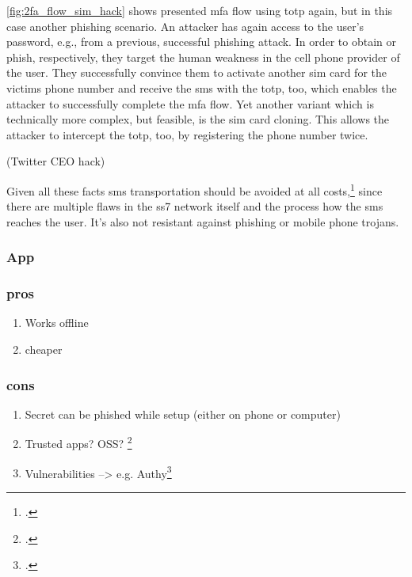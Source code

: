 \autoref{fig:2fa_flow_sim_hack} shows presented \gls{mfa} flow using \gls{totp} again, but in this case another phishing scenario. An attacker has again access to the user's password, e.g., from a previous, successful phishing attack. In order to obtain or phish, respectively, they target the human weakness in the cell phone provider of the user. They successfully convince them to activate another \gls{sim} card for the victims phone number and receive the \gls{sms} with the \gls{totp}, too, which enables the attacker to successfully complete the \gls{mfa} flow. Yet another variant which is technically more complex, but feasible, is the \gls{sim} card cloning. This allows the attacker to intercept the \gls{totp}, too, by registering the phone number twice.

\cite{FIPS198} \cite{SP80063B} (Twitter CEO hack) \cite{twitter-hack}

Given all these facts \gls{sms} transportation should be avoided at all costs,\footcite{JAKOBSSON20186} since there are multiple flaws in the \gls{ss7} network itself and the process how the \gls{sms} reaches the user. It's also not resistant against phishing or mobile phone trojans.


\subsubsection{App}

\subsubsection{pros}

\begin{enumerate}
	\item Works offline
	\item cheaper
\end{enumerate}

\subsubsection{cons}

\begin{enumerate}
	\item Secret can be phished while setup (either on phone or computer)
	\item Trusted apps? OSS? \footcite{eset-bypass2fa}
	\item Vulnerabilities --> e.g. Authy\footcite{sakurity-authy}
\end{enumerate}

